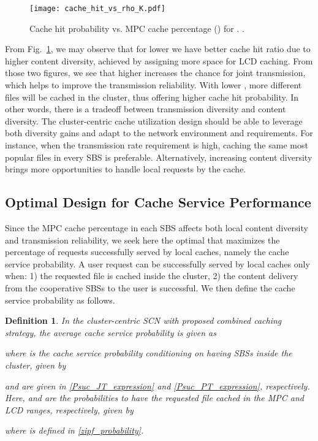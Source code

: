 \documentclass[twocolumns,10pt]{IEEEtran}
\newtheorem{definition}{Definition}
\begin{document}
\begin{figure}
	\centering
	\texttt{[image: cache\_hit\_vs\_rho\_K.pdf]}
	\caption{Cache hit probability vs. MPC cache percentage () for . .}
	\label{Cache_hit}
\end{figure}

From Fig.~\ref{Cache_hit}, we may observe that for lower  we have better cache hit ratio due to higher content diversity, achieved by assigning more space for LCD caching.
From those two figures, we see that higher  increases the chance for joint transmission, which helps to improve the transmission reliability. With lower , more different files will be cached in the cluster, thus offering higher cache hit probability.  
In other words, there is a tradeoff between transmission diversity and content diversity. The cluster-centric cache utilization design should be able to leverage both diversity gains and adapt to the network environment and requirements. For instance,
when the transmission rate requirement is high, caching the same most popular files in every SBS is preferable. Alternatively, increasing content diversity brings more opportunities to handle local requests by the cache. 


\subsection{Optimal Design for Cache Service Performance }
\label{cache_service_optimization}
Since the MPC cache percentage  in each SBS affects both local content diversity and transmission reliability, we seek here the optimal  that maximizes the percentage of requests successfully served by local caches, namely the cache service probability. A user request can be successfully served by local caches only when: 1) the requested file is cached inside the cluster, 2) the content delivery from the cooperative SBSs to the user is successful. We then define the cache service probability as follows.

\begin{definition}
	In the cluster-centric SCN with proposed combined caching strategy, the average cache service probability is given as
	
	where  is the cache service probability conditioning on having  SBSs inside the cluster, given by 
	
 and  are given in \eqref{Psuc_JT_expression} and \eqref{Psuc_PT_expression}, respectively. 
Here,  and  are the probabilities to have the requested file cached in the MPC and LCD ranges, respectively, given by 

where  is defined in \eqref{zipf_probability}.
\end{definition}
\end{document}
